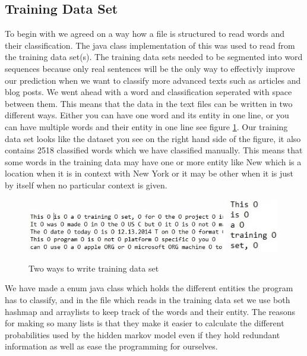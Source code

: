 \documentclass{article}
\begin{document}
\subsection{Training Data Set}
To begin with we agreed on a way how a file is structured to read words and their classification. The java class implementation of this was used to read from the training data set(s). The training data sets needed to be segmented into word sequences because only real sentences will be the only way to effectivly improve our prediction when we want to classify more advanced texts such as articles and blog posts. We went ahead with a word and classification seperated with space between them. This means that the data in the text files can be written in two different ways. Either you can have one word and its entity in one line, or you can have multiple words and their entity in one line see figure \ref{fig:trainingData}. Our training data set looks like the dataset you see on the right hand side of the figure, it also contains 2518 classified words which we have classified manually. This means that some words in the training data may have one or more entity like New which is a location when it is in context with New York or it may be other when it is just by itself when no particular context is given.

\begin{figure}[here]
\centering
\includegraphics[width=0.78\textwidth]{fig/fig2Rapport.jpg}
\includegraphics[width=0.2\textwidth]{fig/fig3Rapport.jpg}
\caption{Two ways to write training data set}
\label{fig:trainingData}
\end{figure}

We have made a enum java class which holds the different entities the program has to classify, and in the file which reads in the training data set we use both hashmap and arraylists to keep track of the words and their entity. The reasons for making so many lists is that they make it easier to calculate the different probabilities used by the hidden markov model even if they hold redundant information as well as ease the programming for ourselves.
\end{document}
